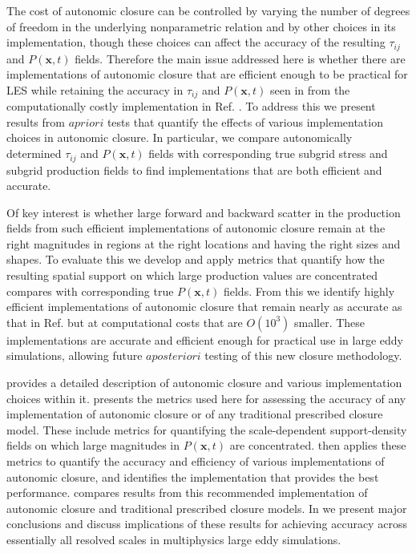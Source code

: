 The cost of autonomic closure can be controlled by varying the number of degrees of freedom in the underlying nonparametric relation and by other choices in its implementation, though these choices can affect the accuracy of the resulting   $\tau_{ij}$   and   $P(\mathbf{x},t)$  fields. Therefore the main issue addressed here is whether there are implementations of autonomic closure that are efficient enough to be practical for LES while retaining the accuracy in   $\tau_{ij}$   and   $P(\mathbf{x},t)$   seen in  from the computationally costly implementation in Ref. \cite{king2016autonomic}. To address this we present results from   $a priori$   tests that quantify the effects of various implementation choices in autonomic closure. In particular, we compare autonomically determined    $\tau_{ij}$   and   $P(\mathbf{x},t)$    fields with corresponding true subgrid stress and subgrid production fields to find implementations that are both efficient and accurate.  

Of key interest is whether large forward and backward scatter in the production fields from such efficient implementations of autonomic closure remain at the right magnitudes in regions at the right locations and having the right sizes and shapes. To evaluate this we develop and apply metrics that quantify how the resulting spatial support on which large production values are concentrated compares with corresponding true  $P(\mathbf{x},t)$  fields. From this we identify highly efficient implementations of autonomic closure that remain nearly as accurate as that in Ref. \cite{king2016autonomic} but at computational costs that are $O(10^3)$ smaller. These implementations are accurate and efficient enough for practical use in large eddy simulations, allowing future $a posteriori$ testing of this new closure methodology. 

 provides a detailed description of autonomic closure and various implementation choices within it.  presents the metrics used here for assessing the accuracy of any implementation of autonomic closure or of any traditional prescribed closure model. These include metrics for quantifying the scale-dependent support-density fields on which large magnitudes in   $P(\mathbf{x},t)$  are concentrated.  then applies these metrics to quantify the accuracy and efficiency of various implementations of autonomic closure, and identifies the implementation that provides the best performance.  compares results from this recommended implementation of autonomic closure and traditional prescribed closure models. In  we present major conclusions and discuss implications of these results for achieving accuracy across essentially all resolved scales in multiphysics large eddy simulations. 

